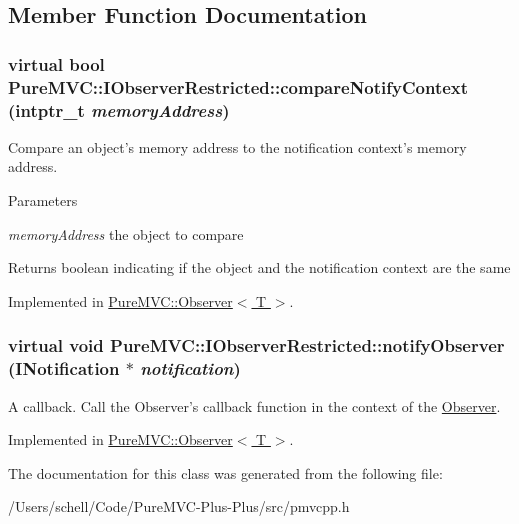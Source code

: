 \subsection{Member Function Documentation}
\hypertarget{class_pure_m_v_c_1_1_i_observer_restricted_a773762b441d4944e77b5b53789a4c52b}{
\subsubsection[{compareNotifyContext}]{\setlength{\rightskip}{0pt plus 5cm}virtual bool PureMVC::IObserverRestricted::compareNotifyContext (intptr\_\-t {\em memoryAddress})}}
\label{class_pure_m_v_c_1_1_i_observer_restricted_a773762b441d4944e77b5b53789a4c52b}


Compare an object's memory address to the notification context's memory address. 
\begin{DoxyParams}{Parameters}
\item[{\em memoryAddress}]the object to compare \end{DoxyParams}
\begin{DoxyReturn}{Returns}
boolean indicating if the object and the notification context are the same 
\end{DoxyReturn}


Implemented in \hyperlink{class_pure_m_v_c_1_1_observer_a1b8be3d83deabe4c0c820af7821459a1}{PureMVC::Observer$<$ T $>$}.\hypertarget{class_pure_m_v_c_1_1_i_observer_restricted_a808a9378a31b068f285fe0b4446048e1}{
\subsubsection[{notifyObserver}]{\setlength{\rightskip}{0pt plus 5cm}virtual void PureMVC::IObserverRestricted::notifyObserver ({\bf INotification} $\ast$ {\em notification})}}
\label{class_pure_m_v_c_1_1_i_observer_restricted_a808a9378a31b068f285fe0b4446048e1}


A callback. Call the Observer's callback function in the context of the \hyperlink{class_pure_m_v_c_1_1_observer}{Observer}. 

Implemented in \hyperlink{class_pure_m_v_c_1_1_observer_a79996aa1a9b0d7e03c333ec177df74f1}{PureMVC::Observer$<$ T $>$}.

The documentation for this class was generated from the following file:\begin{DoxyCompactItemize}
\item 
/Users/schell/Code/PureMVC-\/Plus-\/Plus/src/pmvcpp.h\end{DoxyCompactItemize}
